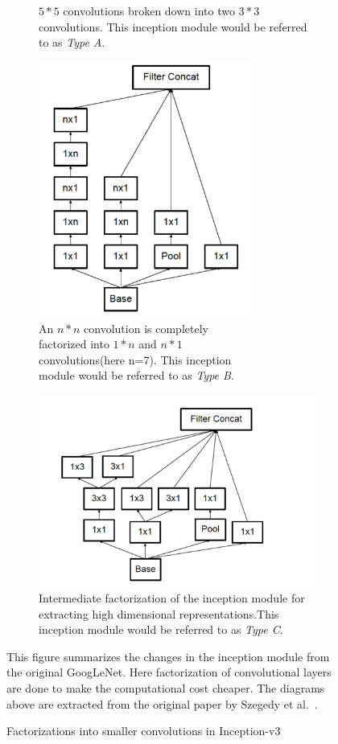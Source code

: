 \begin{figure}[!hb]
\begin{subfigure}[t]{0.49\textwidth}
        \centering
        \caption{$5*5$ convolutions broken down into two $3*3$ convolutions. This inception module would be referred to as \textit{Type A}.}
        \label{typea}
    \end{subfigure}
        \centering
    \begin{subfigure}[t]{0.49\textwidth}
        \includegraphics[width=7cm]{Figures/typeb}
        \caption{An $n*n$ convolution is completely \\factorized into $1*n$ and $n*1$ \\convolutions(here n=7). This inception \\module would be referred to as \textit{Type B}. }
        \label{typeb}
    \end{subfigure}
    \centering
        \begin{subfigure}[t]{0.49\textwidth}
        \includegraphics[width=10cm]{Figures/InceptionV2b}
        \caption{Intermediate factorization of the inception module for extracting high dimensional representations.This inception module would be referred to as \textit{Type C}.}
    \label{typec}
    \end{subfigure}
    \caption{Factorizations into smaller convolutions in Inception-v3}  
    \label{Inceptiontypes}
    This figure summarizes the changes in the inception module from the original GoogLeNet. Here factorization of convolutional layers are done to make the computational cost cheaper. The diagrams above are extracted from the original paper by Szegedy et al.~\cite{Inception-v3}.
\end{figure}



